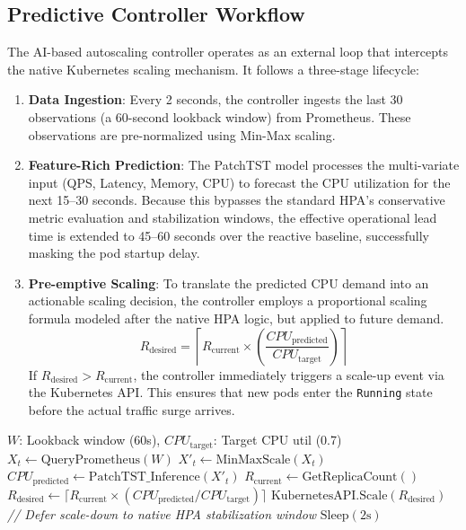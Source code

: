 \documentclass[conference]{IEEEtran}
\begin{document}
\subsection{Predictive Controller Workflow}
The AI-based autoscaling controller operates as an external loop that intercepts the native Kubernetes scaling mechanism. It follows a three-stage lifecycle:

\begin{enumerate}
    \item \textbf{Data Ingestion}: Every 2 seconds, the controller ingests the last 30 observations (a 60-second lookback window) from Prometheus. These observations are pre-normalized using Min-Max scaling.
    \item \textbf{Feature-Rich Prediction}: The PatchTST model processes the multi-variate input (QPS, Latency, Memory, CPU) to forecast the CPU utilization for the next 15--30 seconds. Because this bypasses the standard HPA's conservative metric evaluation and stabilization windows, the effective operational lead time is extended to 45--60 seconds over the reactive baseline, successfully masking the pod startup delay.
    \item \textbf{Pre-emptive Scaling}: To translate the predicted CPU demand into an actionable scaling decision, the controller employs a proportional scaling formula modeled after the native HPA logic, but applied to future demand.
    \begin{equation}
    \label{eq:scaling}
    R_{\text{desired}}
    =
    \left\lceil
    R_{\text{current}}
    \times
    \left(
    \frac{CPU_{\text{predicted}}}
    {CPU_{\text{target}}}
    \right)
    \right\rceil
    \end{equation}
    \noindent If $R_{\text{desired}} > R_{\text{current}}$, the controller immediately triggers a scale-up event via the Kubernetes API. This ensures that new pods enter the \texttt{Running} state before the actual traffic surge arrives.
\end{enumerate}

\begin{algorithm}[H]
\caption{Proactive PatchTST Autoscaling Loop}
\label{alg:scaling}
\begin{algorithmic}[1]
\REQUIRE $W$: Lookback window (60s), $CPU_{\text{target}}$: Target CPU util (0.7)
\LOOP
    \STATE $X_{t} \leftarrow \text{QueryPrometheus}(W)$
    \STATE $X'_{t} \leftarrow \text{MinMaxScale}(X_{t})$
    \STATE $CPU_{\text{predicted}} \leftarrow \text{PatchTST\_Inference}(X'_{t})$
        \STATE $R_{\text{current}} \leftarrow \text{GetReplicaCount}()$
        \STATE $R_{\text{desired}} \leftarrow \lceil R_{\text{current}} \times (CPU_{\text{predicted}} / CPU_{\text{target}}) \rceil$
            \STATE $\text{KubernetesAPI.Scale}(R_{\text{desired}})$
        \ELSE
            \STATE \textit{// Defer scale-down to native HPA stabilization window}
        \ENDIF
    \ENDIF
    \STATE $\text{Sleep}(2\text{s})$
\ENDLOOP
\end{algorithmic}
\end{algorithm}
\end{document}
